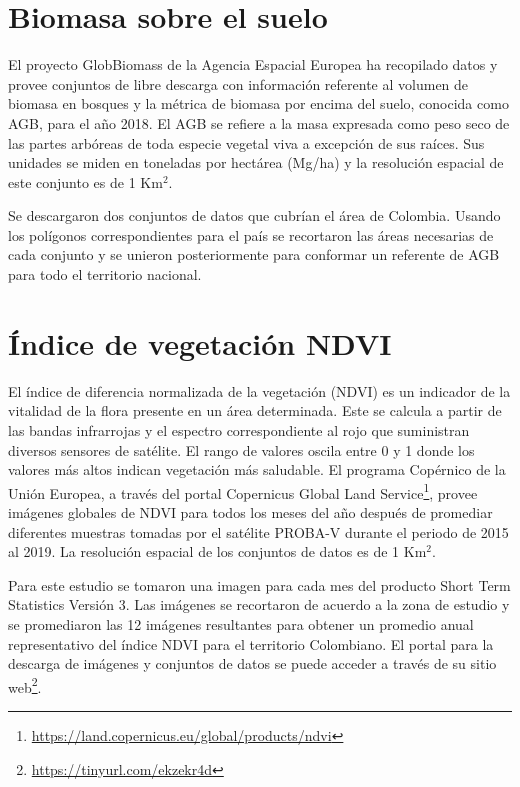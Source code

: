 \section{Biomasa sobre el suelo}

El proyecto GlobBiomass \cite{santoro_globbiomass_2018, santoro_detailed_2018} de la Agencia Espacial Europea ha recopilado datos y provee conjuntos de libre 
descarga con información referente al volumen de biomasa en bosques y la métrica de biomasa por encima del suelo, conocida como AGB, para el año 2018.  El AGB 
se refiere a la masa expresada como peso seco de las partes arbóreas de toda especie vegetal viva a excepción de sus raíces.  Sus unidades se miden en toneladas 
por hectárea (Mg/ha) y la resolución espacial de este conjunto es de 1 Km$^2$.

Se descargaron dos conjuntos de datos que cubrían el área de Colombia.  Usando los polígonos correspondientes para el país se recortaron las áreas necesarias de 
cada conjunto y se unieron posteriormente para conformar un referente de AGB para todo el territorio nacional.

\section{Índice de vegetación NDVI}

El índice de diferencia normalizada de la vegetación (NDVI) es un indicador de la vitalidad de la flora presente en un área determinada.  Este se calcula a 
partir de las bandas infrarrojas y el espectro correspondiente al rojo que suministran diversos sensores de satélite.  El rango de valores oscila entre 0 y 1 
donde los valores más altos indican vegetación más saludable.  El programa Copérnico de la Unión Europea, a través del portal Copernicus Global Land 
Service\footnote{\url{https://land.copernicus.eu/global/products/ndvi}}, provee imágenes globales de NDVI para todos los meses del año después de promediar 
diferentes muestras tomadas por el satélite PROBA-V durante el periodo de 2015 al 2019.  La resolución espacial de los conjuntos de datos es de 1 Km$^2$. 

Para este estudio se tomaron una imagen para cada mes del producto Short Term Statistics Versión 3.  Las imágenes se recortaron de acuerdo a la zona de estudio 
 y se promediaron las 12 imágenes resultantes para obtener un promedio anual representativo del índice NDVI para el territorio Colombiano.  El portal para la 
descarga de imágenes y conjuntos de datos se puede acceder a través de su sitio web\footnote{\url{ https://tinyurl.com/ekzekr4d}}.

